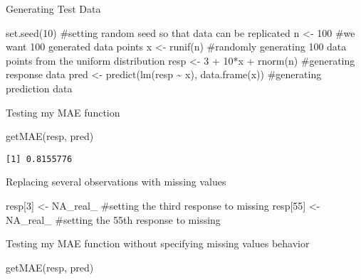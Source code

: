 \documentclass[
  letterpaper,
  DIV=11,
  numbers=noendperiod]{scrartcl}
\newenvironment{Shaded}{\begin{snugshade}}{\end{snugshade}}
\newcommand{\CommentTok}[1]{\textcolor[rgb]{0.37,0.37,0.37}{#1}}
\newcommand{\ConstantTok}[1]{\textcolor[rgb]{0.56,0.35,0.01}{#1}}
\newcommand{\DecValTok}[1]{\textcolor[rgb]{0.68,0.00,0.00}{#1}}
\newcommand{\FunctionTok}[1]{\textcolor[rgb]{0.28,0.35,0.67}{#1}}
\newcommand{\NormalTok}[1]{\textcolor[rgb]{0.00,0.23,0.31}{#1}}
\newcommand{\OtherTok}[1]{\textcolor[rgb]{0.00,0.23,0.31}{#1}}
\newcommand{\SpecialCharTok}[1]{\textcolor[rgb]{0.37,0.37,0.37}{#1}}
\begin{document}
Generating Test Data

\begin{Shaded}
\begin{Highlighting}[]
\FunctionTok{set.seed}\NormalTok{(}\DecValTok{10}\NormalTok{) }\CommentTok{\#setting random seed so that data can be replicated}
\NormalTok{n }\OtherTok{\textless{}{-}} \DecValTok{100} \CommentTok{\#we want 100 generated data points}
\NormalTok{x }\OtherTok{\textless{}{-}} \FunctionTok{runif}\NormalTok{(n) }\CommentTok{\#randomly generating 100 data points from the uniform distribution}
\NormalTok{resp }\OtherTok{\textless{}{-}} \DecValTok{3} \SpecialCharTok{+} \DecValTok{10}\SpecialCharTok{*}\NormalTok{x }\SpecialCharTok{+} \FunctionTok{rnorm}\NormalTok{(n) }\CommentTok{\#generating response data}
\NormalTok{pred }\OtherTok{\textless{}{-}} \FunctionTok{predict}\NormalTok{(}\FunctionTok{lm}\NormalTok{(resp }\SpecialCharTok{\textasciitilde{}}\NormalTok{ x), }\FunctionTok{data.frame}\NormalTok{(x)) }\CommentTok{\#generating prediction data}
\end{Highlighting}
\end{Shaded}

Testing my MAE function

\begin{Shaded}
\begin{Highlighting}[]
\FunctionTok{getMAE}\NormalTok{(resp, pred)}
\end{Highlighting}
\end{Shaded}

\begin{verbatim}
[1] 0.8155776
\end{verbatim}

Replacing several observations with missing values

\begin{Shaded}
\begin{Highlighting}[]
\NormalTok{resp[}\DecValTok{3}\NormalTok{] }\OtherTok{\textless{}{-}} \ConstantTok{NA\_real\_} \CommentTok{\#setting the third response to missing}
\NormalTok{resp[}\DecValTok{55}\NormalTok{] }\OtherTok{\textless{}{-}} \ConstantTok{NA\_real\_} \CommentTok{\#setting the 55th response to missing}
\end{Highlighting}
\end{Shaded}

Testing my MAE function without specifying missing values behavior

\begin{Shaded}
\begin{Highlighting}[]
\FunctionTok{getMAE}\NormalTok{(resp, pred)}
\end{Highlighting}
\end{Shaded}
\end{document}
